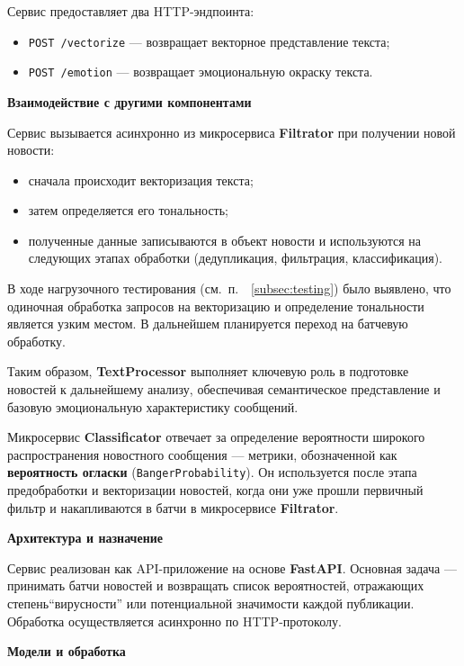 Сервис предоставляет два HTTP-эндпоинта:
\begin{itemize}
    \item \texttt{POST /vectorize} — возвращает векторное представление текста;
    \item \texttt{POST /emotion} — возвращает эмоциональную окраску текста.
\end{itemize}

\textbf{Взаимодействие с другими компонентами}

Сервис вызывается асинхронно из микросервиса \textbf{Filtrator} при получении новой новости:
\begin{itemize}
    \item сначала происходит векторизация текста;
    \item затем определяется его тональность;
    \item полученные данные записываются в объект новости и используются на следующих этапах обработки (дедупликация, фильтрация, классификация).
\end{itemize}

В ходе нагрузочного тестирования (см.\ п.\ ~\ref{subsec:testing}) было выявлено, что одиночная обработка запросов на векторизацию и определение тональности является узким местом. В дальнейшем планируется переход на батчевую обработку.

Таким образом, \textbf{TextProcessor} выполняет ключевую роль в подготовке новостей к дальнейшему анализу, обеспечивая семантическое представление и базовую эмоциональную характеристику сообщений.

Микросервис \textbf{Classificator} отвечает за определение вероятности широкого распространения новостного сообщения — метрики, обозначенной как \textbf{вероятность огласки} (\texttt{BangerProbability}).
Он используется после этапа предобработки и векторизации новостей, когда они уже прошли первичный фильтр и накапливаются в батчи в микросервисе \textbf{Filtrator}.

\textbf{Архитектура и назначение}

Сервис реализован как API-приложение на основе \textbf{FastAPI}.
Основная задача — принимать батчи новостей и возвращать список вероятностей, отражающих степень``вирусности'' или потенциальной значимости каждой публикации.
Обработка осуществляется асинхронно по HTTP-протоколу.

\textbf{Модели и обработка}

